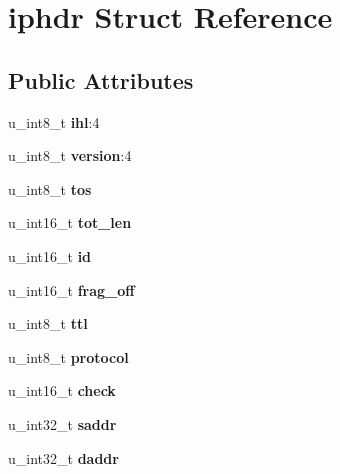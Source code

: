 \hypertarget{structiphdr}{
\section{iphdr Struct Reference}
\label{structiphdr}
}
\subsection*{Public Attributes}
\begin{DoxyCompactItemize}
\item 
\hypertarget{structiphdr_a7abb73dcd1869d95ce7fdc2c37e8f303}{
u\_\-int8\_\-t {\bfseries ihl}:4}
\label{structiphdr_a7abb73dcd1869d95ce7fdc2c37e8f303}

\item 
\hypertarget{structiphdr_a98a745e83f7abb2a0740a1105dd19f9b}{
u\_\-int8\_\-t {\bfseries version}:4}
\label{structiphdr_a98a745e83f7abb2a0740a1105dd19f9b}

\item 
\hypertarget{structiphdr_af6eb567b75fbd1a1ac344b6224e3e997}{
u\_\-int8\_\-t {\bfseries tos}}
\label{structiphdr_af6eb567b75fbd1a1ac344b6224e3e997}

\item 
\hypertarget{structiphdr_afb9a04beb05a709253a0cb1252d1efae}{
u\_\-int16\_\-t {\bfseries tot\_\-len}}
\label{structiphdr_afb9a04beb05a709253a0cb1252d1efae}

\item 
\hypertarget{structiphdr_a3b8e98cbc1150c0fe256987e0936a36e}{
u\_\-int16\_\-t {\bfseries id}}
\label{structiphdr_a3b8e98cbc1150c0fe256987e0936a36e}

\item 
\hypertarget{structiphdr_a3b5e4f00ded53d0ca0f68b27c4ee19d8}{
u\_\-int16\_\-t {\bfseries frag\_\-off}}
\label{structiphdr_a3b5e4f00ded53d0ca0f68b27c4ee19d8}

\item 
\hypertarget{structiphdr_ab75b702056e796af8e4f9dd400b8f12d}{
u\_\-int8\_\-t {\bfseries ttl}}
\label{structiphdr_ab75b702056e796af8e4f9dd400b8f12d}

\item 
\hypertarget{structiphdr_a4860ed95595a94008637f9f2b2aaa92f}{
u\_\-int8\_\-t {\bfseries protocol}}
\label{structiphdr_a4860ed95595a94008637f9f2b2aaa92f}

\item 
\hypertarget{structiphdr_a4f3bea3e029a7ba896a10a06c201fde0}{
u\_\-int16\_\-t {\bfseries check}}
\label{structiphdr_a4f3bea3e029a7ba896a10a06c201fde0}

\item 
\hypertarget{structiphdr_a3ac6e6afcf60fa7ff06686ba023d7a8d}{
u\_\-int32\_\-t {\bfseries saddr}}
\label{structiphdr_a3ac6e6afcf60fa7ff06686ba023d7a8d}

\item 
\hypertarget{structiphdr_a8788442a9d5137e69f7ae62a1195f0b5}{
u\_\-int32\_\-t {\bfseries daddr}}
\label{structiphdr_a8788442a9d5137e69f7ae62a1195f0b5}

\end{DoxyCompactItemize}


